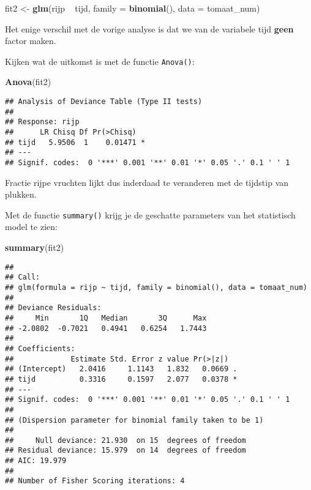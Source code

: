 \documentclass[]{book}
\newenvironment{Shaded}{\begin{snugshade}}{\end{snugshade}}
\newcommand{\KeywordTok}[1]{\textcolor[rgb]{0.13,0.29,0.53}{\textbf{{#1}}}}
\newcommand{\DataTypeTok}[1]{\textcolor[rgb]{0.13,0.29,0.53}{{#1}}}
\newcommand{\StringTok}[1]{\textcolor[rgb]{0.31,0.60,0.02}{{#1}}}
\newcommand{\NormalTok}[1]{{#1}}
\theoremstyle{definition}
\theoremstyle{definition}
\theoremstyle{definition}
\theoremstyle{remark}
\begin{document}
\begin{Shaded}
\begin{Highlighting}[]
\NormalTok{fit2 <-}\StringTok{ }\KeywordTok{glm}\NormalTok{(rijp ~}\StringTok{ }\NormalTok{tijd, }\DataTypeTok{family =} \KeywordTok{binomial}\NormalTok{(), }\DataTypeTok{data =} \NormalTok{tomaat_num)}
\end{Highlighting}
\end{Shaded}

Het enige verschil met de vorige analyse is dat we van de variabele tijd
\textbf{geen} factor maken.

Kijken wat de uitkomst is met de functie \texttt{Anova()}:

\begin{Shaded}
\begin{Highlighting}[]
\KeywordTok{Anova}\NormalTok{(fit2)}
\end{Highlighting}
\end{Shaded}

\begin{verbatim}
## Analysis of Deviance Table (Type II tests)
## 
## Response: rijp
##      LR Chisq Df Pr(>Chisq)  
## tijd   5.9506  1    0.01471 *
## ---
## Signif. codes:  0 '***' 0.001 '**' 0.01 '*' 0.05 '.' 0.1 ' ' 1
\end{verbatim}

Fractie rijpe vruchten lijkt dus inderdaad te veranderen met de tijdstip
van plukken.

Met de functie \texttt{summary()} krijg je de geschatte parameters van
het statistisch model te zien:

\begin{Shaded}
\begin{Highlighting}[]
\KeywordTok{summary}\NormalTok{(fit2)}
\end{Highlighting}
\end{Shaded}

\begin{verbatim}
## 
## Call:
## glm(formula = rijp ~ tijd, family = binomial(), data = tomaat_num)
## 
## Deviance Residuals: 
##     Min       1Q   Median       3Q      Max  
## -2.0802  -0.7021   0.4941   0.6254   1.7443  
## 
## Coefficients:
##             Estimate Std. Error z value Pr(>|z|)  
## (Intercept)   2.0416     1.1143   1.832   0.0669 .
## tijd          0.3316     0.1597   2.077   0.0378 *
## ---
## Signif. codes:  0 '***' 0.001 '**' 0.01 '*' 0.05 '.' 0.1 ' ' 1
## 
## (Dispersion parameter for binomial family taken to be 1)
## 
##     Null deviance: 21.930  on 15  degrees of freedom
## Residual deviance: 15.979  on 14  degrees of freedom
## AIC: 19.979
## 
## Number of Fisher Scoring iterations: 4
\end{verbatim}
\end{document}
